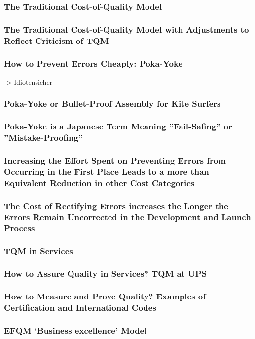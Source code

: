 \subsubsection{The Traditional Cost-of-Quality Model}
\subsubsection{The Traditional Cost-of-Quality Model with Adjustments to Reflect Criticism of TQM}
\subsubsection{How to Prevent Errors Cheaply: Poka-Yoke}
-> Idiotensicher
\subsubsection{Poka-Yoke or Bullet-Proof Assembly for Kite Surfers}
\subsubsection{Poka-Yoke is a Japanese Term Meaning ''Fail-Safing'' or ''Mistake-Proofing'' }
\subsubsection{Increasing the Effort Spent on Preventing Errors from Occurring in the First Place Leads to a more than Equivalent Reduction in other	Cost Categories}
\subsubsection{The Cost of Rectifying Errors increases the Longer the Errors Remain Uncorrected in the Development and Launch Process}
\subsubsection{TQM in Services}
\subsubsection{How to Assure Quality in Services? TQM at UPS}
\subsubsection{How to Measure and Prove Quality? Examples of Certification and International Codes }
\subsubsection{EFQM ‘Business excellence’ Model}
